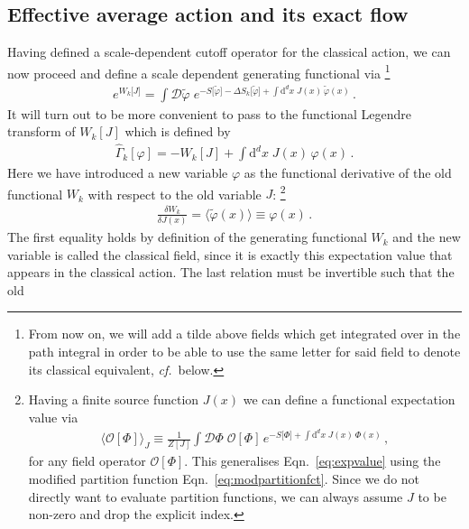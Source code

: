 \documentclass[11pt]{book}
\newcommand\cf{\textit{cf.}\ }
\numberwithin{equation}{chapter}
\begin{document}
\subsection{Effective average action and its exact flow}
\label{sec:floweqn}

Having defined a scale-dependent cutoff operator for the
classical action, we can now proceed and define a scale
dependent generating functional via%
\footnote{%
  From now on,
  we will add a tilde above fields which get integrated over in the
  path integral in order to be able to use the same letter for said
  field to denote its classical equivalent, \cf below.
}
\begin{align}
  e^{ W_k \lbrack J \rbrack }
  = \int \mathcal D \tilde \varphi \;
  e^{
    - S \lbrack \tilde \varphi \rbrack
    - \Delta S_k \lbrack \tilde \varphi \rbrack
    + \int \mathrm d^dx \; J(x) \, \tilde \varphi(x)
  } \,.
\end{align}
It will turn out to be more convenient to pass to the
functional Legendre transform of $W_k[J]$
which is defined by
\begin{align}
  \hat \Gamma_k [\varphi] = - W_k[J] + \int \mathrm d^dx \; J(x) \, \varphi(x) \,.
\end{align}
Here we have introduced a new variable $\varphi$ as
the functional derivative of the old functional $W_k$ with
respect to the old variable $J$:%
\footnote{%
  Having a finite source function $J(x)$ we can define a
  functional expectation value via
  \begin{align*}
    \big\langle  \mathcal O[\Phi] \big\rangle_J
    \equiv \frac{1}{Z[J]} \int \mathcal D \Phi \;
    \mathcal O[\Phi] \,
    e^{
      - S \lbrack \Phi \rbrack
      + \int \mathrm d^dx \; J(x) \, \Phi(x)
    } \,,
    \label{eq:expvalueJ}
  \end{align*}
  for any field operator $\mathcal O[\Phi]$. This generalises
  Eqn.~\eqref{eq:expvalue} using the modified partition
  function Eqn.~\eqref{eq:modpartitionfct}. Since we do not
  directly want to evaluate partition functions,
  we can always assume $J$ to be non-zero and drop the explicit index.
}
\begin{align}
  \frac{ \delta W_k }{ \delta J(x) }
  = \big\langle \tilde \varphi(x) \big\rangle
  \equiv \varphi (x) \,.
\end{align}
The first equality holds by definition of the generating functional
$W_k$ and the new variable is called the classical field, since
it is exactly this expectation value that appears in the classical
action. The last relation must be invertible such that the old
\end{document}
